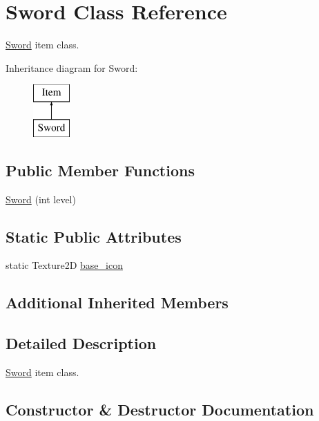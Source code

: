 \hypertarget{class_sword}{}\section{Sword Class Reference}
\label{class_sword}


\mbox{\hyperlink{class_sword}{Sword}} item class.  


Inheritance diagram for Sword\+:\begin{figure}[H]
\begin{center}
\leavevmode
\includegraphics[height=2.000000cm]{class_sword}
\end{center}
\end{figure}
\subsection*{Public Member Functions}
\begin{DoxyCompactItemize}
\item 
\mbox{\hyperlink{class_sword_ae8f29c644df340edb5b70d8e3e632c3b}{Sword}} (int level)
\end{DoxyCompactItemize}
\subsection*{Static Public Attributes}
\begin{DoxyCompactItemize}
\item 
static Texture2D \mbox{\hyperlink{class_sword_a0436b5543c05676e2c63830b40c2c589}{base\+\_\+icon}}
\end{DoxyCompactItemize}
\subsection*{Additional Inherited Members}


\subsection{Detailed Description}
\mbox{\hyperlink{class_sword}{Sword}} item class. 

\subsection{Constructor \& Destructor Documentation}
\mbox{\label{class_sword_ae8f29c644df340edb5b70d8e3e632c3b}} 
